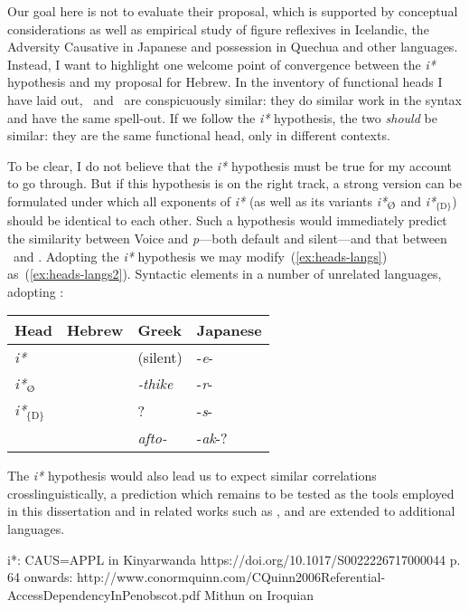 Our goal here is not to evaluate their proposal, which is supported by conceptual considerations as well as empirical study of figure reflexives in Icelandic, the Adversity Causative in Japanese and possession in Quechua and other languages. Instead, I want to highlight one welcome point of convergence between the \emph{i*} hypothesis and my proposal for Hebrew. In the inventory of functional heads I have laid out, \vz~and \pz~are conspicuously similar: they do similar work in the syntax and have the same spell-out. If we follow the \emph{i*} hypothesis, the two \emph{should} be similar: they are the same functional head, only in different contexts.

To be clear, I do not believe that the \emph{i*} hypothesis must be true for my account to go through. But if this hypothesis is on the right track, a strong version can be formulated under which all exponents of \emph{i*} (as well as its variants \emph{i*}$_{\text{\zero}}$ and \emph{i*}$_{\{\text{D}\}}$) should be identical to each other. Such a hypothesis would immediately predict the similarity between Voice and \emph{p}---both default and silent---and that between \vz~and \pz. {Adopting the \emph{i*} hypothesis we may modify~(\ref{ex:heads-langs}) as~(\ref{ex:heads-langs2}).}
\ex\label{ex:heads-langs2}Syntactic elements in a number of unrelated languages, adopting \cite{woodmarantz15}:\\
	\begin{tabular}{l|lll}
	Head 		& Hebrew 		& Greek  		& Japanese\\\hline
	\emph{i*}   	& \tkal     & (silent)      & -\emph{e}-\\
	\emph{i*}$_{\text{\zero}}$ 	& \tnif 	& \emph{-thike}	& -\emph{r}-\\
	\emph{i*}$_{\text{\{D\}}}$	& \thif		& ?		& -\emph{s}-\\
	{\va}	& \tpie		& \emph{afto-}	& -\emph{ak}-?\\
	\end{tabular}
\xe

The \emph{i*} hypothesis would also lead us to expect similar correlations crosslinguistically, a prediction which remains to be tested as the tools employed in this dissertation and in related works such as \cite{schaefer08}, \cite{spathasetal15} and \cite{wood15springer} are extended to additional languages.


i*: CAUS=APPL in Kinyarwanda https://doi.org/10.1017/S0022226717000044
p. 64 onwards: http://www.conormquinn.com/CQuinn2006Referential-AccessDependencyInPenobscot.pdf
Mithun on Iroquian

